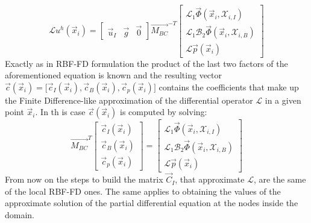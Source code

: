 \begin{equation}
	\label{eqn:FD_like_discretization_of_L_middle_step_RBF-HFD}
	\mathcal{L} u^h(\vec{x}_i) = 
	\begin{bmatrix}
		\vec{u}_I  &  \vec{g}  &  \vec{0}
	\end{bmatrix}
	\vec{M_{BC}}^{-T}
	\begin{bmatrix}
		\mathcal{L}_1 \vec{\Phi}(\vec{x}_i, \mathcal{X}_{i,I})  			  \\
		\mathcal{L}_1 \mathcal{B}_2 \vec{\Phi}(\vec{x}_i, \mathcal{X}_{i,B})  \\
		\mathcal{L} \vec{p}(\vec{x}_i)
	\end{bmatrix}	
\end{equation}
Exactly as in RBF-FD formulation the product of the last two factors of the aforementioned equation is known and the resulting vector $\vec{c}(\vec{x}_i) = \bigl[ \vec{c}_I(\vec{x}_i), \vec{c}_B(\vec{x}_i), \vec{c}_p(\vec{x}_i) \bigr]$ contains the coefficients that make up the Finite Difference-like approximation of the differential operator $ \mathcal{L}$ in a given point $\vec{x}_i$. In th is case $\vec{c}(\vec{x}_i) $ is computed by solving:
\begin{equation}
	\label{eqn:row_of_C_system}
	\vec{M_{BC}}^T
	\begin{bmatrix}
		\vec{c}_I(\vec{x}_i)  \\
		\vec{c}_B(\vec{x}_i)  \\
		\vec{c}_p(\vec{x}_i)
	\end{bmatrix} = 
	\begin{bmatrix}
		\mathcal{L}_1 \vec{\Phi}(\vec{x}_i, \mathcal{X}_{i,I})  			  \\
		\mathcal{L}_1 \mathcal{B}_2 \vec{\Phi}(\vec{x}_i, \mathcal{X}_{i,B})  \\
		\mathcal{L} \vec{p}(\vec{x}_i)
	\end{bmatrix}
\end{equation}
From now on the steps to build the matrix $\vec{C}_I$, that approximate $\mathcal{L}$, are the same of the local RBF-FD ones. The same applies to obtaining the values of the approximate solution of the partial differential equation at the nodes inside the domain.









